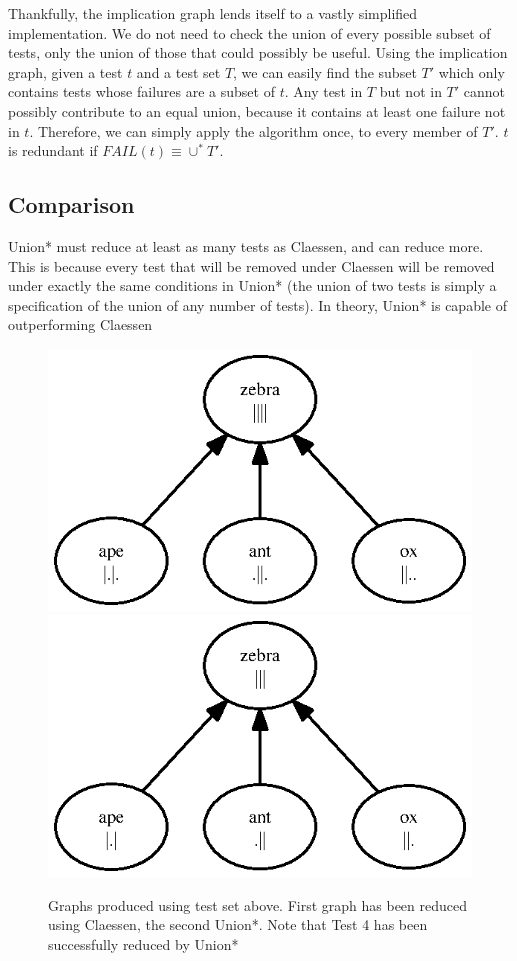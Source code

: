 \documentclass[11pt,twoside]{article}
\begin{document}
Thankfully, the implication graph lends itself to a vastly simplified implementation. We do not need to check the union of every possible subset of tests, only the union of those that could possibly be useful. Using the implication graph, given a test $t$ and a test set $T$, we can easily find the subset $T'$ which only contains tests whose failures are a subset of $t$. Any test in $T$ but not in $T'$ cannot possibly contribute to an equal union, because it contains at least one failure not in $t$. Therefore, we can simply apply the algorithm once, to every member of $T'$. $t$ is redundant if $FAIL(t) \equiv \cup^* T'$.

\subsection{Comparison}
Union* must reduce at least as many tests as Claessen, and can reduce more. This is because every test that will be removed under Claessen will be removed under exactly the same conditions in Union* (the union of two tests is simply a specification of the union of any number of tests). In theory, Union* is capable of outperforming Claessen

\begin{figure}

\includegraphics{toy.ps}
\includegraphics{toyb.ps}
\caption{Graphs produced using test set above. First graph has been reduced using Claessen, the second Union*. Note that Test 4 has been successfully reduced by Union*}
\end{figure}
\end{document}
